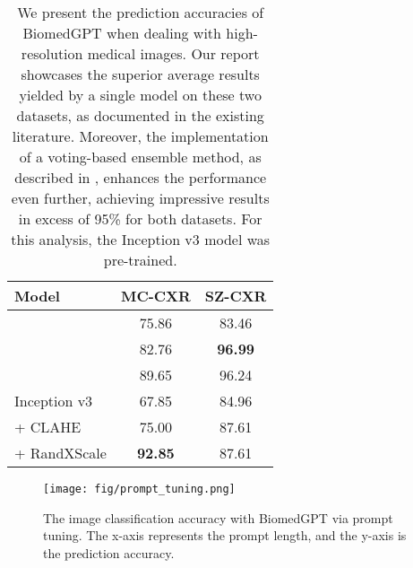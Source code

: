 \documentclass[10pt]{article} \usepackage[preprint]{tmlr}
\begin{document}
\begin{table}[htbp]
\centering
\caption{We present the prediction accuracies of BiomedGPT when dealing with high-resolution medical images. Our report showcases the superior average results yielded by a single model on these two datasets, as documented in the existing literature. Moreover, the implementation of a voting-based ensemble method, as described in \citep{tasci2021voting}, enhances the performance even further, achieving impressive results in excess of 95\% for both datasets. For this analysis, the Inception v3 model was pre-trained.}\label{tab:high_resolution} 
\begin{tabular}{lcc}
\toprule
Model & MC-CXR & SZ-CXR \\ \midrule
 & 75.86 & 83.46 \\
 & 82.76 & \textbf{96.99} \\
 & 89.65 & 96.24 \\
Inception v3 \citep{szegedy2016rethinking} & 67.85 & 84.96 \\
{    } + CLAHE~\citep{pizer1986psychovisual, pizer1987adaptive} & 75.00 & 87.61 \\
{    } + RandXScale & \textbf{92.85} & 87.61 \\ \bottomrule
\end{tabular}
\end{table}

\begin{wrapfigure}{r}{0.4\textwidth}
  \begin{center}
    \texttt{[image: fig/prompt\_tuning.png]}
  \end{center}
  \caption{The image classification accuracy with BiomedGPT via prompt tuning. The x-axis represents the prompt length, and the y-axis is the prediction accuracy.} 
  \label{fig:prompt_tuning}
\end{wrapfigure}
\end{document}
